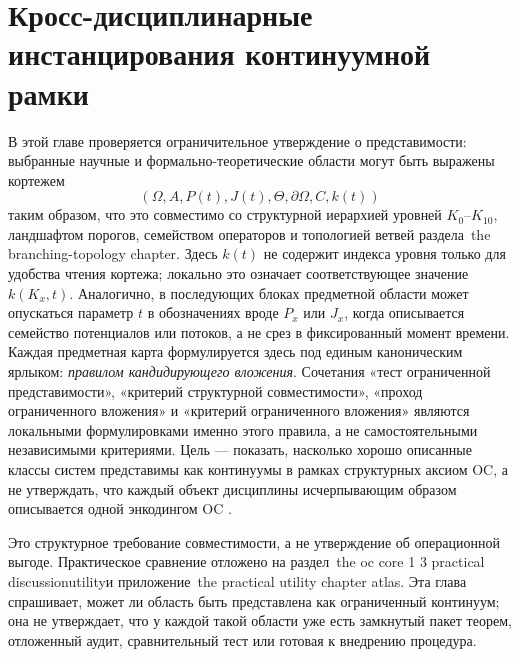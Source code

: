 
\section{Кросс-дисциплинарные инстанцирования континуумной рамки}
\label{sec:disciplines-extended}

В этой главе проверяется ограничительное утверждение о представимости:
выбранные научные и формально-теоретические области могут быть выражены
кортежем
\[
  (\Omega, A, P(t), J(t), \Theta, \partial\Omega, C, k(t))
\]
таким образом, что это совместимо со структурной иерархией уровней
\(K_0\)–\(K_{10}\), ландшафтом порогов, семейством операторов и топологией
ветвей раздела~the branching-topology chapter.
Здесь \(k(t)\) не содержит индекса уровня только для удобства чтения кортежа;
локально это означает соответствующее значение \(k(K_x,t)\).
Аналогично, в последующих блоках предметной области может опускаться
параметр \(t\) в обозначениях вроде \(P_x\) или \(J_x\), когда описывается
семейство потенциалов или потоков, а не срез в фиксированный момент времени.
Каждая предметная карта формулируется здесь под единым каноническим ярлыком:
\emph{правилом кандидирующего вложения}. Сочетания «тест ограниченной
представимости», «критерий структурной совместимости», «проход ограниченного
вложения» и «критерий ограниченного вложения» являются локальными
формулировками именно этого правила, а не самостоятельными независимыми
критериями. Цель — показать, насколько хорошо описанные классы систем
представимы как континуумы в рамках структурных аксиом OC, а не утверждать,
что каждый объект дисциплины исчерпывающим образом описывается одной
энкодингом OC \parencite{anderson_more_is_different}.

Это структурное требование совместимости, а не утверждение об
операционной выгоде. Практическое сравнение отложено на
раздел~the oc core 1 3 practical discussionutilityи
приложение~the practical utility chapter atlas.
Эта глава спрашивает, может ли область быть представлена как ограниченный
континуум; она не утверждает, что у каждой такой области уже есть замкнутый
пакет теорем, отложенный аудит, сравнительный тест или готовая к внедрению
процедура.

